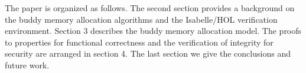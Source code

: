 The paper is organized as follows. The second section provides a background on the buddy memory allocation algorithms and the Isabelle/HOL verification environment. Section 3 describes the buddy memory allocation model. The proofs to properties for functional correctness and the verification of integrity for security are arranged in section 4. The last section we give the conclusions and future work.
